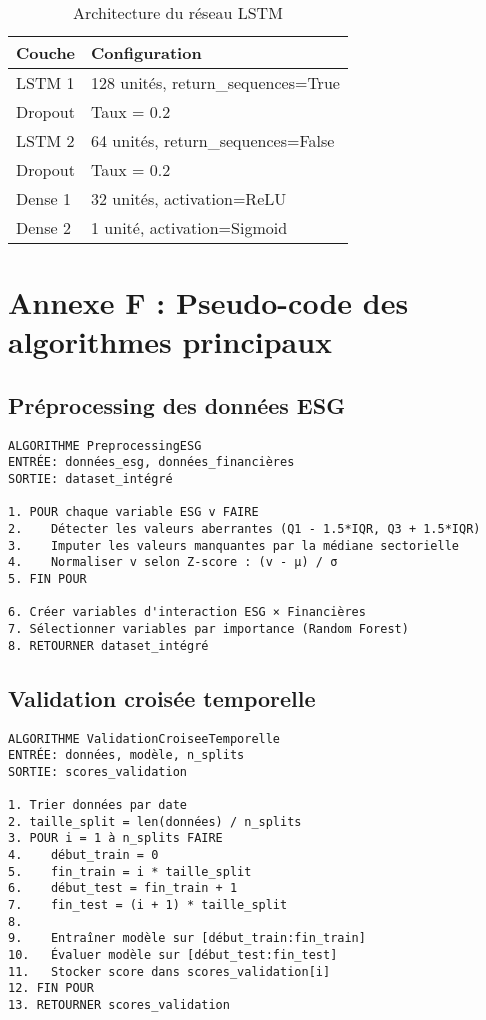 \begin{table}[h]
\centering
\begin{tabular}{|l|l|}
\hline
\textbf{Couche} & \textbf{Configuration} \\
\hline
LSTM 1 & 128 unités, return\_sequences=True \\
Dropout & Taux = 0.2 \\
LSTM 2 & 64 unités, return\_sequences=False \\
Dropout & Taux = 0.2 \\
Dense 1 & 32 unités, activation=ReLU \\
Dense 2 & 1 unité, activation=Sigmoid \\
\hline
\end{tabular}
\caption{Architecture du réseau LSTM}
\end{table}

\section{Annexe F : Pseudo-code des algorithmes principaux}

\subsection{Préprocessing des données ESG}

\begin{verbatim}
ALGORITHME PreprocessingESG
ENTRÉE: données_esg, données_financières
SORTIE: dataset_intégré

1. POUR chaque variable ESG v FAIRE
2.    Détecter les valeurs aberrantes (Q1 - 1.5*IQR, Q3 + 1.5*IQR)
3.    Imputer les valeurs manquantes par la médiane sectorielle
4.    Normaliser v selon Z-score : (v - μ) / σ
5. FIN POUR

6. Créer variables d'interaction ESG × Financières
7. Sélectionner variables par importance (Random Forest)
8. RETOURNER dataset_intégré
\end{verbatim}

\subsection{Validation croisée temporelle}

\begin{verbatim}
ALGORITHME ValidationCroiseeTemporelle
ENTRÉE: données, modèle, n_splits
SORTIE: scores_validation

1. Trier données par date
2. taille_split = len(données) / n_splits
3. POUR i = 1 à n_splits FAIRE
4.    début_train = 0
5.    fin_train = i * taille_split
6.    début_test = fin_train + 1
7.    fin_test = (i + 1) * taille_split
8.    
9.    Entraîner modèle sur [début_train:fin_train]
10.   Évaluer modèle sur [début_test:fin_test]
11.   Stocker score dans scores_validation[i]
12. FIN POUR
13. RETOURNER scores_validation
\end{verbatim}

